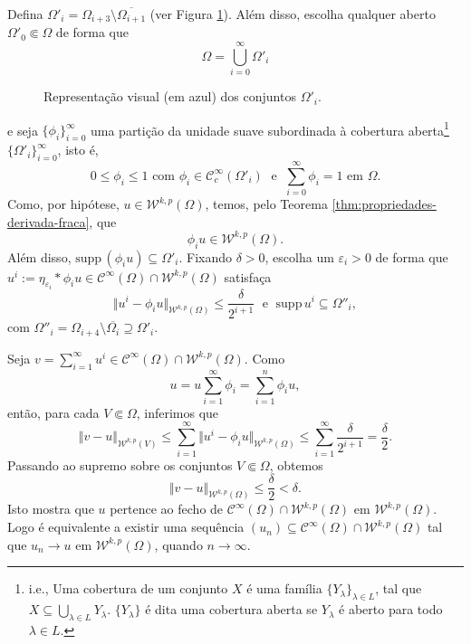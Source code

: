 \documentclass[a4paper, 11pt]{book}
\theoremstyle{definition}
\newcommand{\cC}{\mathcal{C}}
\newcommand{\cW}{\mathcal{W}}
\newcommand{\supp}{\mathrm{supp}\,}
\begin{document}
\begin{prf}
    Defina $\Omega'_i = \Omega_{i+3} \setminus \overline{\Omega_{i+1}}$ (ver Figura \ref{fig:omegaii}).
    Além disso, escolha qualquer aberto $\Omega'_0 \Subset \Omega$ de forma que
    \[
        \Omega = \bigcup_{i=0}^\infty \Omega'_i
    \]
    \begin{figure}
        \centering
        
        \caption{Representação visual (em azul) dos conjuntos $\Omega'_i$.}
        \label{fig:omegaii}
    \end{figure}
    e seja $\{\phi_i\}_{i=0}^\infty$ uma partição da unidade suave subordinada à cobertura aberta\footnote{i.e., Uma cobertura de um conjunto $X$ é uma família $\{Y_\lambda\}_{\lambda\in L}$, tal que $X \subseteq \bigcup_{\lambda \in L} Y_\lambda$. $\{Y_\lambda\}$ é dita uma cobertura aberta se $Y_\lambda$ é aberto para todo $\lambda \in L$.} $\{\Omega'_i\}_{i=0}^\infty$, isto é,
    \[
       0 \leqslant \phi_i \leqslant 1 \text{ com } \phi_i \in \cC^\infty_c(\Omega'_i) \;\text{ e }\; \sum_{i=0}^\infty \phi_i = 1 \text{ em } \Omega.
    \]
    Como, por hipótese, $u \in \cW^{k,p}(\Omega)$, temos, pelo Teorema \ref{thm:propriedades-derivada-fraca}, que
    \[
        \phi_i u \in \cW^{k,p}(\Omega).
    \]
    Além disso, $\supp(\phi_i u) \subseteq \Omega'_i$.
    Fixando $\delta > 0$, escolha um $\varepsilon_i > 0$ de forma que $u^i := \eta_{\varepsilon_i} * \phi_i u \in \cC^{\infty}(\Omega) \cap \cW^{k,p}(\Omega)$ satisfaça
    \[
        \Vert u^i - \phi_i u \Vert_{\cW^{k,p}(\Omega)} \leqslant \frac{\delta}{2^{i+1}} \;\text{ e }\; \supp u^i \subseteq \Omega''_i,
    \]
    com $\Omega''_i = \Omega_{i+4} \setminus \overline{\Omega_{i}} \supseteq \Omega'_i$.

    Seja $v = \sum_{i=1}^\infty u^i \in \cC^{\infty}(\Omega) \cap \cW^{k,p}(\Omega)$.
    Como 
    \[
        u = u \sum_{i=1}^\infty \phi_i = \sum_{i=1}^n \phi_i u,
    \]
    então, para cada $V \Subset \Omega$, inferimos que
    \[
        \Vert v - u \Vert_{\cW^{k,p}(V)} \leqslant \sum_{i=1}^\infty \Vert u^i - \phi_i u \Vert_{\cW^{k,p}(\Omega)} \leqslant \sum_{i=1}^\infty \frac{\delta}{2^{i+1}} = \frac{\delta}{2}.
    \]
    Passando ao supremo sobre os conjuntos $V \Subset \Omega$, obtemos
    \[
        \Vert v - u \Vert_{\cW^{k,p}(\Omega)} \leqslant \frac{\delta}{2} < \delta.
    \]
    Isto mostra que $u$ pertence ao fecho de $\cC^\infty(\Omega) \cap \cW^{k,p}(\Omega)$ em $\cW^{k,p}(\Omega)$. Logo é equivalente a existir uma sequência $(u_n) \subseteq \cC^\infty(\Omega) \cap \cW^{k,p}(\Omega)$ tal que $u_n \to u$ em $\cW^{k,p}(\Omega)$, quando $n \to \infty$.
\end{prf}
\end{document}
